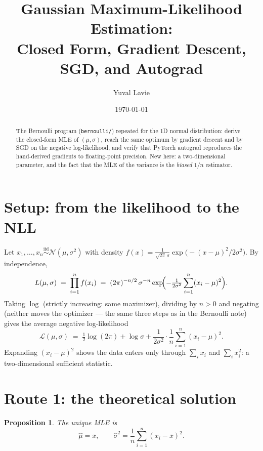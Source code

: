 \documentclass[11pt]{article}
\title{Gaussian Maximum-Likelihood Estimation:\\
Closed Form, Gradient Descent, SGD, and Autograd}
\author{Yuval Lavie}
\date{\today}
\newtheorem{proposition}{Proposition}
\newcommand{\xbar}{\bar{x}}
\begin{document}
\maketitle

\begin{abstract}
The Bernoulli program (\texttt{bernoulli/}) repeated for the 1D normal
distribution: derive the closed-form MLE of $(\mu,\sigma)$, reach the same
optimum by gradient descent and by SGD on the negative log-likelihood, and
verify that PyTorch autograd reproduces the hand-derived gradients to
floating-point precision. New here: a two-dimensional parameter, and the
fact that the MLE of the variance is the \emph{biased} $1/n$ estimator.
\end{abstract}

\section{Setup: from the likelihood to the NLL}

Let $x_1,\dots,x_n \overset{\text{iid}}{\sim} \mathcal{N}(\mu,\sigma^2)$
with density
$f(x) = \tfrac{1}{\sqrt{2\pi}\,\sigma}
\exp\!\bigl(-(x-\mu)^2/2\sigma^2\bigr)$. By independence,
\begin{equation}
  L(\mu,\sigma)
  \;=\; \prod_{i=1}^n f(x_i)
  \;=\; (2\pi)^{-n/2}\,\sigma^{-n}
        \exp\!\Bigl(-\tfrac{1}{2\sigma^2}\sum_{i=1}^n (x_i-\mu)^2\Bigr).
  \label{eq:likelihood}
\end{equation}
Taking $\log$ (strictly increasing: same maximizer), dividing by $n>0$ and
negating (neither moves the optimizer — the same three steps as in the
Bernoulli note) gives the average negative log-likelihood
\begin{equation}
  \mathcal{L}(\mu,\sigma)
  \;=\; \tfrac12\log(2\pi) + \log\sigma
        + \frac{1}{2\sigma^2}\cdot\frac1n\sum_{i=1}^n (x_i-\mu)^2 .
  \label{eq:nll}
\end{equation}
Expanding $(x_i-\mu)^2$ shows the data enters only through
$\sum_i x_i$ and $\sum_i x_i^2$: a two-dimensional sufficient statistic.

\section{Route 1: the theoretical solution}

\begin{proposition}
The unique MLE is
\begin{equation}
  \boxed{\;\hat\mu = \xbar, \qquad
  \hat\sigma^2 = \frac1n\sum_{i=1}^n (x_i-\xbar)^2 . \;}
  \label{eq:mle}
\end{equation}
\end{proposition}
\end{document}

